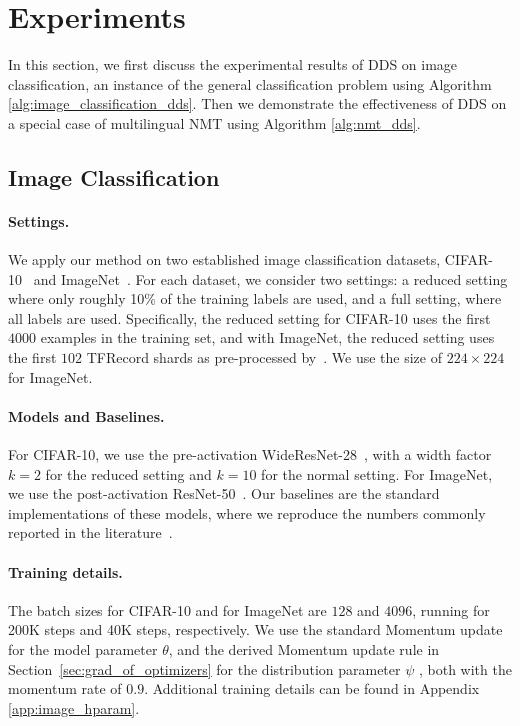 \section{\label{sec:experiment}Experiments}
In this section, we first discuss the experimental results of DDS on image classification, an instance of the general classification problem using Algorithm \ref{alg:image_classification_dds}. Then we demonstrate the effectiveness of DDS on a special case of multilingual NMT using Algorithm \ref{alg:nmt_dds}.

\subsection{\label{exp:image_classification}Image Classification}

\paragraph{Settings.} We apply our method on two established image classification datasets, CIFAR-10~\citep{cifar10} and ImageNet~\citep{imagenet}. For each dataset, we consider two settings: a reduced setting where only roughly 10\% of the training labels are used, and a full setting, where all labels are used. Specifically, the reduced setting for CIFAR-10 uses the first $4000$ examples in the training set, and with ImageNet, the reduced setting uses the first $102$ TFRecord shards as pre-processed by~\citet{imagenet_generalize_better}. We use the size of $224 \times 224$ for ImageNet.

\paragraph{Models and Baselines.} For CIFAR-10, we use the pre-activation WideResNet-28~\citep{wide_res_net}, with a width factor $k=2$ for the reduced setting and $k=10$ for the normal setting. For ImageNet, we use the post-activation ResNet-50~\citep{res_net}. Our baselines are the standard implementations of these models, where we reproduce the numbers commonly reported in the literature~\citep{wide_res_net,res_net,resnext}.

\paragraph{Training details.} The batch sizes for CIFAR-10 and for ImageNet are $128$ and $4096$, running for 200K steps and 40K steps, respectively. We use the standard Momentum update for the model parameter $\theta$, and the derived Momentum update rule in Section~\ref{sec:grad_of_optimizers} for the distribution parameter $\psi$ , both with the momentum rate of $0.9$. Additional training details can be found in Appendix \ref{app:image_hparam}.

